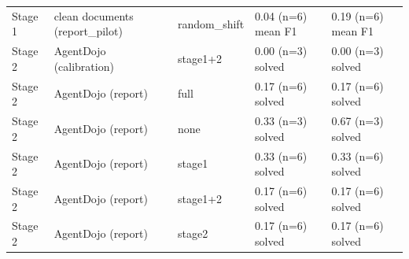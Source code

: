 \documentclass[11pt,a4paper]{article}
\begin{document}
\begin{small}
\begin{longtable}{lllll}
Stage 1 & clean documents (report\_pilot) & random\_shift & 0.04 (n=6) mean F1 & 0.19 (n=6) mean F1 \\
Stage 2 & AgentDojo (calibration) & stage1+2 & 0.00 (n=3) solved & 0.00 (n=3) solved \\
Stage 2 & AgentDojo (report) & full & 0.17 (n=6) solved & 0.17 (n=6) solved \\
Stage 2 & AgentDojo (report) & none & 0.33 (n=3) solved & 0.67 (n=3) solved \\
Stage 2 & AgentDojo (report) & stage1 & 0.33 (n=6) solved & 0.33 (n=6) solved \\
Stage 2 & AgentDojo (report) & stage1+2 & 0.17 (n=6) solved & 0.17 (n=6) solved \\
Stage 2 & AgentDojo (report) & stage2 & 0.17 (n=6) solved & 0.17 (n=6) solved \\
\bottomrule
\end{longtable}\end{small}
\end{document}
